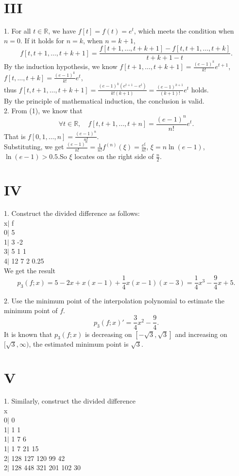 \documentclass[a4paper]{article}
\begin{document}
\section*{III}
1. For all \( t \in \mathbb{R} \), we have \( f[t] = f(t) = e^t \), which meets the condition when \( n = 0 \). If it holds for \( n = k \),
when \( n = k + 1 \),
\[
f[t, t+1, \ldots, t+k+1] = \frac{f[t+1, \ldots, t+k+1] - f[t, t+1, \ldots, t+k]}{t+k+1 - t}.
\]
By the induction hypothesis, we know \( f[t+1, \ldots, t+k+1] = \frac{(e-1)^k}{k!} e^{t+1} \),
\( f[t, \ldots, t+k] = \frac{(e-1)^k}{k!} e^t \),\\
thus \( f[t, t+1, \ldots, t+k+1] = \frac{(e-1)^k (e^{t+1} - e^t)}{k! (k+1)} = \frac{(e-1)^{k+1}}{(k+1)!} e^t \) holds.\\
 By the principle of mathematical induction, the conclusion is valid.\\

2. From (1), we know that\\
\[
\forall t \in \mathbb{R}, \quad f[t, t+1, \ldots, t+n] = \frac{(e-1)^n}{n!} e^t.
\]
That is \( f[0, 1, \ldots, n] = \frac{(e-1)^n}{n!} \). \\
Substituting, we get \( \frac{(e-1)^n}{n!} = \frac{1}{n!} f^{(n)}(\xi) =\frac{e^{\xi}}{n!}\),
\( \xi = n \ln(e-1) \),\\
\( \ln(e-1) > 0.5 \).So $\xi$ locates on the right side of \( \frac{n}{2} \).\\

\section*{IV}
1. Construct the divided difference as follows:\\
x$|$ f\\
0$|$ 5\\
1$|$ 3  -2\\
3$|$ 5  1 1\\
4$|$ 12 7 2 0.25\\
We get the result
\[
p_3(f; x) = 5 - 2x + x(x - 1) + \frac{1}{4}x(x - 1)(x - 3) = \frac{1}{4}x^3 - \frac{9}{4}x + 5.
\]

2. Use the minimum point of the interpolation polynomial to estimate the minimum point of \( f \).
\[
p_3(f; x)' = \frac{3}{4}x^2 - \frac{9}{4}.
\]
It is known that \( p_3(f; x) \) is decreasing on \( [-\sqrt{3}, \sqrt{3}] \) and increasing on \( [\sqrt{3}, \infty) \), the estimated minimum point is \( \sqrt{3} \).

\section*{V}
1.
Similarly, construct the divided difference\\
  x\\
  0$|$ 0\\
  1$|$ 1 1\\
  1$|$ 1 7 6\\
  1$|$ 1 7 21 15\\
  2$|$ 128 127 120 99 42\\
  2$|$ 128 448 321 201 102 30\\
\end{document}
